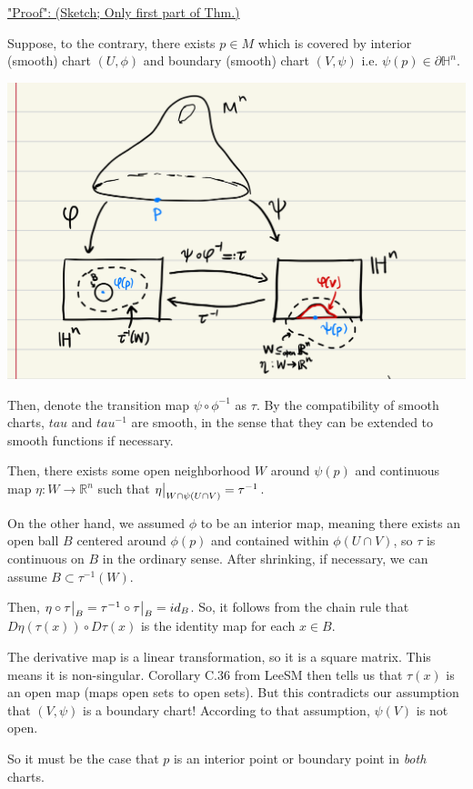\documentclass{article}
\newcommand{\R}{\mathbb{R}}
\newcommand{\halfplane}{\mathbb{H}}
\newcommand{\restr}[2]{{%
  \left.\kern-\nulldelimiterspace %
  #1 %
  \vphantom{\big|} %
  \right|_{#2} %
  }}
\begin{document}
\begin{dottedbox}
  \vskip 0.5cm
\underline{"Proof": (Sketch; Only first part of Thm.)}

\vskip 0.5cm
Suppose, to the contrary, there exists $p \in M$ which is covered by interior (smooth) chart $(U, \phi)$ and boundary (smooth) chart $(V, \psi)$ i.e. $\psi(p) \in \partial \halfplane^n$.

\begin{center}
  \includegraphics*[scale=0.20]{Thm 1.46.png}
\end{center}
\vskip 0.5cm

Then, denote the transition map $\psi \circ \phi^{-1}$ as $\tau$. By the compatibility of smooth charts, $tau$ and $tau^{-1}$ are smooth, in the sense that they can be extended to smooth functions if necessary.

\vskip 0.25cm
Then, there exists some open neighborhood $W$ around $\psi(p)$ and continuous map $\eta : W \rightarrow \R^n$ such that $\restr{\eta}{W \cap \psi(U \cap V)} = \tau^{-1}$.

\vskip 0.25cm
On the other hand, we assumed $\phi$ to be an interior map, meaning there exists an open ball $B$ centered around $\phi(p)$ and contained within $\phi(U \cap V)$, so $\tau$ is continuous on $B$ in the ordinary sense. After shrinking, if necessary, we can assume $B \subset \tau^{-1}(W)$.

\vskip 0.25cm
Then, $\restr{\eta \circ \tau}{B} = \restr{\tau^{-1} \circ \tau}{B} = id_{B}$. So, it follows from the chain rule that $D\eta(\tau(x)) \circ D\tau(x)$ is the identity map for each $x \in B$.

\vskip 0.25cm
The derivative map is a linear transformation, so it is a square matrix. This means it is non-singular. Corollary C.36 from LeeSM then tells us that $\tau(x)$ is an open map (maps open sets to open sets). But this contradicts our assumption that $(V, \psi)$ is a boundary chart! According to that assumption, $\psi(V)$ is not open. 

\vskip 0.25cm
So it must be the case that $p$ is an interior point or boundary point in \emph{both} charts.

\end{dottedbox}
\end{document}
